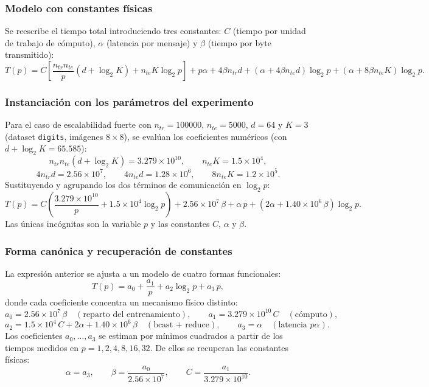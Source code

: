\documentclass[11pt,a4paper]{article}
\begin{document}
\subsubsection{Modelo con constantes físicas}

Se reescribe el tiempo total introduciendo tres constantes: $C$ (tiempo por unidad de trabajo de
cómputo), $\alpha$ (latencia por mensaje) y $\beta$ (tiempo por byte transmitido):
\[
T(p)
=
C\left[
\frac{n_{tr}n_{te}}{p}(d+\log_2 K) + n_{te}K\log_2 p
\right]
+
p\alpha
+
4\beta n_{tr}d
+
(\alpha + 4\beta n_{te}d)\log_2 p
+
(\alpha + 8\beta n_{te}K)\log_2 p.
\]

\subsubsection{Instanciación con los parámetros del experimento}

Para el caso de escalabilidad fuerte con $n_{tr}=100000$, $n_{te}=5000$, $d=64$ y $K=3$
(dataset \texttt{digits}, imágenes $8\times8$), se evalúan los coeficientes numéricos
(con $d+\log_2 K = 65.585$):
\[
n_{tr}n_{te}(d+\log_2 K) = 3.279\times10^{10},
\qquad
n_{te}K = 1.5\times10^4,
\]
\[
4n_{tr}d = 2.56\times10^7,
\qquad
4n_{te}d = 1.28\times10^6,
\qquad
8n_{te}K = 1.2\times10^5.
\]
Sustituyendo y agrupando los dos términos de comunicación en $\log_2 p$:
\[
\boxed{
T(p)
=
C\left(
\frac{3.279\times10^{10}}{p}
+
1.5\times10^4\log_2 p
\right)
+
2.56\times10^7\,\beta
+
\alpha\,p
+
\left(2\alpha + 1.40\times10^6\,\beta\right)\log_2 p
}.
\]
Las únicas incógnitas son la variable $p$ y las constantes $C$, $\alpha$ y $\beta$.

\subsubsection{Forma canónica y recuperación de constantes}

La expresión anterior se ajusta a un modelo de cuatro formas funcionales:
\[
T(p) = a_0 + \frac{a_1}{p} + a_2\log_2 p + a_3\,p,
\]
donde cada coeficiente concentra un mecanismo físico distinto:
\[
a_0 = 2.56\times10^7\,\beta
\quad(\text{reparto del entrenamiento}),
\qquad
a_1 = 3.279\times10^{10}\,C
\quad(\text{cómputo}),
\]
\[
a_2 = 1.5\times10^4\,C + 2\alpha + 1.40\times10^6\,\beta
\quad(\text{bcast + reduce}),
\qquad
a_3 = \alpha
\quad(\text{latencia } p\alpha).
\]
Los coeficientes $a_0,\dots,a_3$ se estiman por mínimos cuadrados a partir de los tiempos medidos
en $p = 1,2,4,8,16,32$. De ellos se recuperan las constantes físicas:
\[
\alpha = a_3,
\qquad
\beta = \frac{a_0}{2.56\times10^7},
\qquad
C = \frac{a_1}{3.279\times10^{10}}.
\]
\end{document}
